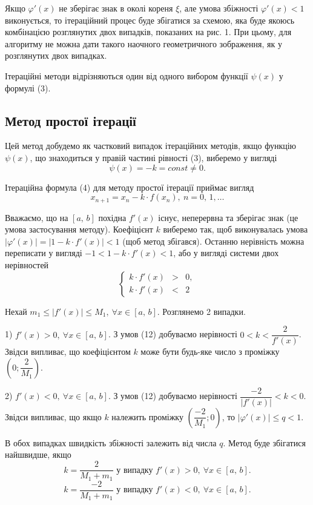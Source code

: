 \documentclass[14pt,a4paper,titlepage]{extarticle}
\begin{document}
Якщо $\varphi'(x)$ не зберігає знак в околі кореня $\xi$, але умова збіжності $\varphi'(x)<1$ виконується, то ітераційний процес буде збігатися за схемою, яка буде якоюсь комбінацією розглянутих двох випадків, показаних на рис. 1. При цьому, для алгоритму не можна дати такого наочного геометричного зображення, як у розглянутих двох випадках.

Ітераційні методи відрізняються один від одного вибором функції $\psi(x)$ у формулі (3).

{\centering \subsection{Метод простої ітерації}}

Цей метод добудемо як частковий випадок ітераційних методів, якщо функцію $\psi(x)$, що знаходиться у правій частині рівності (3), виберемо у вигляді
$$
\psi(x)=-k=const\neq0.
$$

Ітераційна формула (4) для методу простої ітерації приймає вигляд
$$
x_{n+1}=x_n-k\cdot f(x_n),\ n=0,\,1,\ldots
$$

Вважаємо, що на $[a,\, b]$ похідна $f'(x)$ існує, неперервна та зберігає знак (це умова застосування методу). Коефіцієнт $k$ виберемо так, щоб виконувалась умова $\left|\varphi'(x)\right|=\left|1-k\cdot f'(x)\right|<1$ (щоб метод збігався). Останню нерівність можна переписати у вигляді $-1<1-k\cdot f'(x)<1$, або у вигляді системи двох нерівностей
\begin{equation}
\left\{\begin{aligned}
k\cdot f'(x)&>&0,\\
k\cdot f'(x)&<&2
\end{aligned}
\right.
\end{equation}

Нехай $m_1\leqslant\left|f'(x)\right|\leqslant M_1,\ \forall x\in[a,\, b]$. Розглянемо 2 випадки.

1) $f'(x)>0,\ \forall x\in[a,\, b]$. З умов (12) добуваємо нерівності $0<k<\dfrac{2}{f'(x)}$. Звідси випливає, що коефіцієнтом $k$ може бути будь-яке число з проміжку $\left(0;\dfrac{2}{M_1}\right)$.

2) $f'(x)<0,\ \forall x\in[a,\, b]$. З умов (12) добуваємо нерівності $\dfrac{-2}{\left|f'(x)\right|}<k<0$. Звідси випливає, що якщо $k$ належить проміжку $\left(\dfrac{-2}{M_1};0\right)$, то $\left|\varphi'(x)\right|\leqslant q<1$.

В обох випадках швидкість збіжності залежить від числа $q$. Метод буде збігатися найшвидше, якщо 
\begin{equation}
k=\frac{2}{M_1+m_1}\text{ у випадку }f'(x)>0,\ \forall x\in[a,\, b].
\end{equation}
\begin{equation}
k=\frac{-2}{M_1+m_1}\text{ у випадку }f'(x)<0,\ \forall x\in[a,\, b].
\end{equation}
\end{document}
